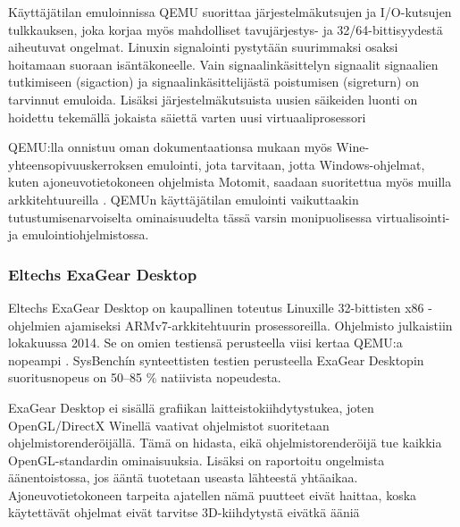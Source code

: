 Käyttäjätilan emuloinnissa QEMU suorittaa järjestelmäkutsujen ja I/O-kutsujen tulkkauksen, joka korjaa myös mahdolliset tavujärjestys- ja 32/64-bittisyydestä aiheutuvat ongelmat. Linuxin signalointi pystytään suurimmaksi osaksi hoitamaan suoraan isäntäkoneelle. Vain signaalinkäsittelyn signaalit signaalien tutkimiseen (sigaction) ja signaalinkäsittelijästä poistumisen (sigreturn) on tarvinnut emuloida. Lisäksi järjestelmäkutsuista uusien säikeiden luonti on hoidettu tekemällä jokaista säiettä varten uusi virtuaaliprosessori \citep{qemu_tech}

QEMU:lla onnistuu oman dokumentaationsa mukaan myös Wine-yhteensopivuuskerroksen emulointi, jota tarvitaan, jotta Windows-ohjelmat, kuten ajoneuvotietokoneen ohjelmista Motomit, saadaan suoritettua myös muilla arkkitehtuureilla \cite{qemu_use}. QEMUn käyttäjätilan emulointi vaikuttaakin tutustumisenarvoiselta ominaisuudelta tässä varsin monipuolisessa virtualisointi- ja emulointiohjelmistossa.


\subsubsection{Eltechs ExaGear Desktop}
Eltechs ExaGear Desktop on kaupallinen toteutus Linuxille 32-bittisten x86 -ohjelmien ajamiseksi ARMv7-arkkitehtuurin prosessoreilla. Ohjelmisto julkaistiin lokakuussa 2014. Se on omien testiensä perusteella viisi kertaa QEMU:a nopeampi \cite{eltechs:exagear}. SysBenchín synteettisten testien perusteella ExaGear Desktopin suoritusnopeus on 50--85 \% natiivista nopeudesta.

ExaGear Desktop ei sisällä grafiikan laitteistokiihdytystukea, joten OpenGL/DirectX Winellä vaativat ohjelmistot suoritetaan ohjelmistorenderöijällä. Tämä on hidasta, eikä ohjelmistorenderöijä tue kaikkia OpenGL-standardin ominaisuuksia. Lisäksi on raportoitu ongelmista äänentoistossa, jos ääntä tuotetaan useasta lähteestä yhtäaikaa. Ajoneuvotietokoneen tarpeita ajatellen nämä puutteet eivät haittaa, koska käytettävät ohjelmat eivät tarvitse 3D-kiihdytystä eivätkä ääniä \citep{eltechs:odroid}

